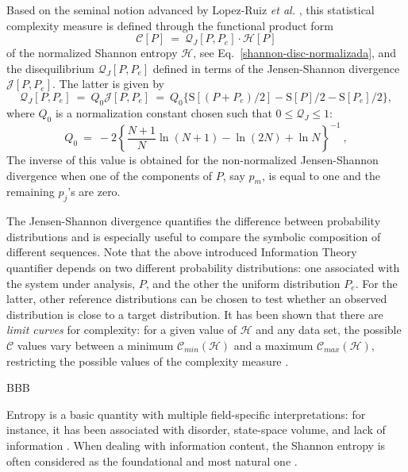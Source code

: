 Based on the seminal notion advanced by Lopez-Ruiz {\it et al.\/} \cite{LMC1995}, this statistical complexity 
measure\cite{Martin2003,Lamberti2004} is defined through the functional product form
\begin{equation}
{\mathcal C}[P] ~=~ {\mathcal Q}_{J}[P,P_e] \cdot {\mathcal H}[P]
\label{complexity}
\end{equation}
of the normalized Shannon entropy ${\mathcal H}$, see Eq.~\eqref{shannon-disc-normalizada}, and the disequilibrium 
${\mathcal Q}_{J}[ P, P_e]$ defined in terms of the Jensen-Shannon divergence ${\mathcal J}[ P, P_e]$.
The latter is given by
\begin{equation}
\label{disequilibrium}
{\mathcal Q}_{J} [ P, P_e] ~=~ Q_{0} {\mathcal J}[ P, P_e] ~=~ 
Q_{0} \{ {\mathrm S}[(P + P_e)/2 ] - {\mathrm S}[ P ]/2 - {\mathrm S}[P_e]/2\},
\end{equation}
where $Q_0$ is a normalization constant chosen 
such that $0 \leq {\mathcal Q}_{J} \leq 1$:
\begin{equation}
Q_0 ~=~ -2 \left\{  {\frac{N+1}{N}}  \ln (N+1) - \ln (2N)  +  \ln N \right\}^{-1} \ ,
\label{q0-jensen-1}
\end{equation}
The inverse of this value is obtained for the non-normalized Jensen-Shannon divergence when one of the components of $P$, say $p_m$, is equal to one and the remaining $p_j$'s are zero.

The Jensen-Shannon divergence quantifies the difference between probability distributions and 
is especially useful to compare the symbolic composition of different sequences\cite{Grosse2002}.
Note that the above introduced Information Theory quantifier depends on two different probability distributions: one associated with the system under analysis, $P$, and the other the uniform distribution $P_e$. For the latter, other reference distributions can be chosen to test whether an observed distribution is close to a target distribution. It has been shown that there are \textit{limit curves} for complexity: for a given value of ${\mathcal H}$ and any data set, the possible ${\mathcal C}$ 
values vary between a minimum ${\mathcal C}_{min}({\mathcal H})$ and a maximum ${\mathcal C}_{max}({\mathcal H})$, 
restricting the possible values of the complexity measure \cite{Martin2006}.

BBB

Entropy is a basic quantity with multiple field-specific interpretations: for instance, it has been associated
with disorder, state-space volume, and lack of information \cite{Brissaud2005}. 
When dealing with information content, the Shannon entropy is often considered as the foundational and most
natural one \cite{Shannon1948,Weaver1949}.

